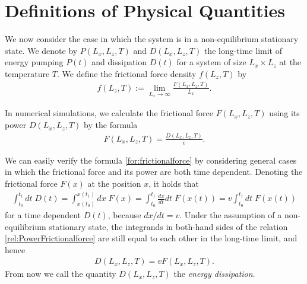 \section{Definitions of Physical Quantities}
We now consider the case in which the system is in a non-equilibrium stationary state. We denote by $P(L_{x}, L_{z}, T)$ and $D(L_{x}, L_{z}, T)$ the long-time limit of energy pumping $P(t)$ and dissipation $D(t)$ for a system of size $L_{x}\times L_{z}$ at the temperature $T$. We define the frictional force density $f(L_{z}, T)$ by
\begin{align}
f(L_{z}, T):=\lim_{L_{x}\to\infty}\frac{F(L_{x}, L_{z}, T)}{L_{x}}.
\end{align}

In numerical simulations, we calculate the frictional force $F(L_{x}, L_{z}, T)$ using its power $D(L_{x}, L_{z}, T)$ by the formula
\begin{align}
F(L_{x}, L_{z}, T)=\frac{D(L_{x}, L_{z}, T)}{v}\label{for:frictionalforce}.
\end{align}

We can easily verify the formula \eqref{for:frictionalforce} by considering general cases in which the frictional force and its power are both time dependent. Denoting the frictional force $F(x)$ at the position $x$, it holds that
\begin{align}
\int_{t_{0}}^{t_{1}}dt\;D(t)=\int_{x(t_{0})}^{x(t_{1})}dx\;F(x)=\int_{t_{0}}^{t_{1}}\frac{dx}{dt}dt\;F(x(t))=v\int_{t_{0}}^{t_{1}}dt\;F(x(t))\label{rel:PowerFrictionalforce}
\end{align}
for a time dependent $D(t)$, because $dx/dt=v$. Under the assumption of a non-equilibrium stationary state, the integrands in both-hand sides of the relation \eqref{rel:PowerFrictionalforce} are still equal to each other in the long-time limit, and hence 
\begin{align}
D(L_{x}, L_{z}, T)=vF(L_{x}, L_{z}, T).
\end{align}
From now we call the quantity $D(L_{x}, L_{z}, T)$ the \textit{energy dissipation}.

